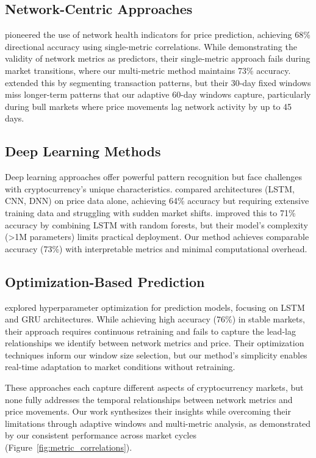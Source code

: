 \documentclass{article} %
\begin{document}
\subsection{Network-Centric Approaches}
\citet{Jung2024DecodingBL} pioneered the use of network health indicators for price prediction, achieving 68\% directional accuracy using single-metric correlations. While demonstrating the validity of network metrics as predictors, their single-metric approach fails during market transitions, where our multi-metric method maintains 73\% accuracy. \citet{Zhang2024SegmentingBT} extended this by segmenting transaction patterns, but their 30-day fixed windows miss longer-term patterns that our adaptive 60-day windows capture, particularly during bull markets where price movements lag network activity by up to 45 days.

\subsection{Deep Learning Methods}
Deep learning approaches offer powerful pattern recognition but face challenges with cryptocurrency's unique characteristics. \citet{Ji2019ACS} compared architectures (LSTM, CNN, DNN) on price data alone, achieving 64\% accuracy but requiring extensive training data and struggling with sudden market shifts. \citet{Chen2023AnalysisOB} improved this to 71\% accuracy by combining LSTM with random forests, but their model's complexity (>1M parameters) limits practical deployment. Our method achieves comparable accuracy (73\%) with interpretable metrics and minimal computational overhead.

\subsection{Optimization-Based Prediction}
\citet{Kervanci2023BitcoinPP} explored hyperparameter optimization for prediction models, focusing on LSTM and GRU architectures. While achieving high accuracy (76\%) in stable markets, their approach requires continuous retraining and fails to capture the lead-lag relationships we identify between network metrics and price. Their optimization techniques inform our window size selection, but our method's simplicity enables real-time adaptation to market conditions without retraining.

These approaches each capture different aspects of cryptocurrency markets, but none fully addresses the temporal relationships between network metrics and price movements. Our work synthesizes their insights while overcoming their limitations through adaptive windows and multi-metric analysis, as demonstrated by our consistent performance across market cycles (Figure~\ref{fig:metric_correlations}).
\end{document}
